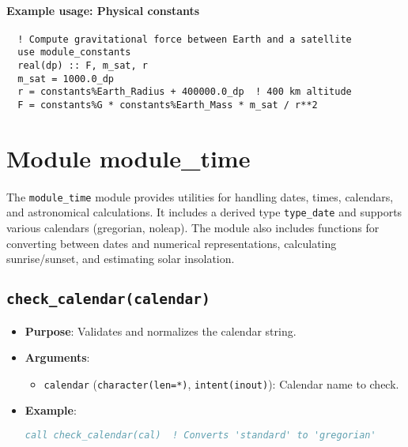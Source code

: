 \documentclass[12pt,a4paper]{report}
\begin{document}
\paragraph{Example usage: Physical constants}
\begin{verbatim}
  ! Compute gravitational force between Earth and a satellite
  use module_constants
  real(dp) :: F, m_sat, r
  m_sat = 1000.0_dp
  r = constants%Earth_Radius + 400000.0_dp  ! 400 km altitude
  F = constants%G * constants%Earth_Mass * m_sat / r**2
\end{verbatim}



\section{Module module\_time}

\paragraph{}
The \texttt{module\_time} module provides utilities for handling dates, times, calendars, and astronomical calculations. It includes a derived type \texttt{type\_date} and supports various calendars (gregorian, noleap). The module also includes functions for converting between dates and numerical representations, calculating sunrise/sunset, and estimating solar insolation.

\subsection{\texttt{check\_calendar(calendar)}}
\begin{itemize}
\item \textbf{Purpose}: Validates and normalizes the calendar string.
\item \textbf{Arguments}:
\begin{itemize}
\item \texttt{calendar} (\texttt{character(len=*)}, \texttt{intent(inout)}): Calendar name to check.
\end{itemize}
\item \textbf{Example}:
\begin{lstlisting}[language=Fortran]
call check_calendar(cal)  ! Converts 'standard' to 'gregorian'
\end{lstlisting}
\end{itemize}
\end{document}
